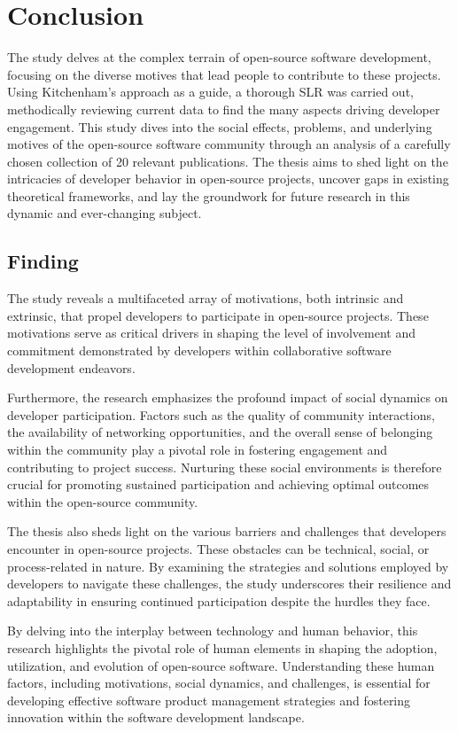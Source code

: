 \section{Conclusion}

The study delves at the complex terrain of open-source software development, focusing on the diverse motives that lead people to contribute to these projects. Using Kitchenham's approach as a guide, a thorough SLR was carried out, methodically reviewing current data to find the many aspects driving developer engagement. This study dives into the social effects, problems, and underlying motives of the open-source software community through an analysis of a carefully chosen collection of 20 relevant publications. The thesis aims to shed light on the intricacies of developer behavior in open-source projects, uncover gaps in existing theoretical frameworks, and lay the groundwork for future research in this dynamic and ever-changing subject.

\subsection{Finding}

The study reveals a multifaceted array of motivations, both intrinsic and extrinsic, that propel developers to participate in open-source projects. These motivations serve as critical drivers in shaping the level of involvement and commitment demonstrated by developers within collaborative software development endeavors.

Furthermore, the research emphasizes the profound impact of social dynamics on developer participation. Factors such as the quality of community interactions, the availability of networking opportunities, and the overall sense of belonging within the community play a pivotal role in fostering engagement and contributing to project success. Nurturing these social environments is therefore crucial for promoting sustained participation and achieving optimal outcomes within the open-source community.

The thesis also sheds light on the various barriers and challenges that developers encounter in open-source projects. These obstacles can be technical, social, or process-related in nature. By examining the strategies and solutions employed by developers to navigate these challenges, the study underscores their resilience and adaptability in ensuring continued participation despite the hurdles they face.

By delving into the interplay between technology and human behavior, this research highlights the pivotal role of human elements in shaping the adoption, utilization, and evolution of open-source software. Understanding these human factors, including motivations, social dynamics, and challenges, is essential for developing effective software product management strategies and fostering innovation within the software development landscape.

